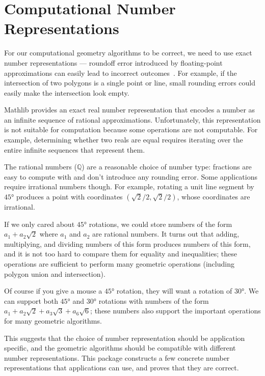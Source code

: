 \chapter{Computational Number Representations}
\label{chap:numbers}

For our computational geometry algorithms to be correct, we need to use exact
number representations --- roundoff error introduced by floating-point
approximations can easily lead to incorrect outcomes~\cite{kettner2008}.
For example, if the intersection of two polygons is a single point or line, small rounding
errors could easily make the intersection look empty.

Mathlib provides an exact real number representation that encodes a number as
an infinite sequence of rational approximations. Unfortunately, this
representation is not suitable for computation because some operations are not
computable. For example, determining whether two reals are equal requires
iterating over the entire infinite sequences that represent them.

The rational numbers ($ℚ$) are a reasonable choice of number type: fractions are easy
to compute with and don't introduce any rounding error. Some applications
require irrational numbers though. For example, rotating a unit line segment by
$45°$ produces a point with coordinates $(\sqrt{2}/2, \sqrt{2}/2)$, whose
coordinates are irrational.

If we only cared about $45°$ rotations, we could store numbers of the
form $a_1 + a_2\sqrt{2}$ where $a_1$ and $a_2$ are rational numbers. It
turns out that adding, multiplying, and dividing numbers of this form produces
numbers of this form, and it is not too hard to compare them for equality and
inequalities; these operations are sufficient to perform many geometric
operations (including polygon union and intersection).

Of course if you give a mouse a $45°$ rotation, they will want a
rotation of $30°$. We can support both $45°$ and $30°$
rotations with numbers of the form
$a_1 + a_2\sqrt{2} + a_3\sqrt{3} + a_6\sqrt{6}$; these numbers also support the
important operations for many geometric algorithms.

This suggests that the choice of number representation should be application
specific, and the geometric algorithms should be compatible with different
number representations. This package constructs a few concrete number
representations that applications can use, and proves that they are correct.

